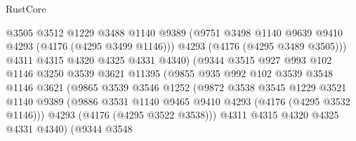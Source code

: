 \begin{lexlean}{RustCore}
\begin{coremodule}
                                  @3505
                                  @3512
                                  @1229
                                  @3488
                                  @1140
                                  @9389
                                  (@9751 @3498 @1140 @9639 @9410 @4293 (@4176 (@4295 @3499 @1146)))
                                  @4293
                                  (@4176 (@4295 @3489 @3505)))
                                @4311
                                @4315
                                @4320
                                @4325
                                @4331
                                @4340)
                              (@9344
                                @3515
                                @927
                                @993
                                @102
                                @1146
                                @3250
                                @3539
                                @3621
                                @11395
                                (@9855
                                  @935
                                  @992
                                  @102
                                  @3539
                                  @3548
                                  @1146
                                  @3621
                                  (@9865
                                    @3539
                                    @3546
                                    @1252
                                    (@9872
                                      @3538
                                      @3545
                                      @1229
                                      @3521
                                      @1140
                                      @9389
                                      (@9886
                                        @3531
                                        @1140
                                        @9465
                                        @9410
                                        @4293
                                        (@4176 (@4295 @3532 @1146)))
                                      @4293
                                      (@4176 (@4295 @3522 @3538)))
                                    @4311
                                    @4315
                                    @4320
                                    @4325
                                    @4331
                                    @4340)
                                  (@9344
                                    @3548

\end{coremodule}
\end{lexlean}
